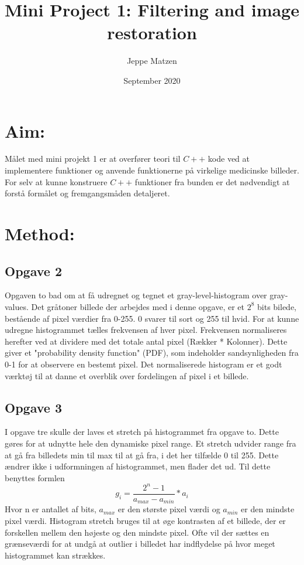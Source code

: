 \documentclass{article}
\title{Mini Project 1: Filtering and image restoration}
\author{Jeppe Matzen}
\date{September 2020}
\begin{document}
 
\lstset{style=mystyle} 
\maketitle 

\section{Aim:} 

Målet med mini projekt 1 er at overfører teori til $C++$ kode ved at implementere funktioner og anvende funktionerne på virkelige medicinske billeder. \newline 
For selv at kunne konstruere $C++$ funktioner fra bunden er det nødvendigt at forstå formålet og fremgangsmåden detaljeret.   

  

\section{Method:} 
\subsection{Opgave 2} 

Opgaven to bad om at få udregnet og tegnet et gray-level-histogram over gray-values. \newline 
Det gråtoner billede der arbejdes med i denne opgave, er et $2^8$ bits bilede, bestående af pixel værdier fra 0-255. 0 svarer til sort og 255 til hvid. \newline 
For at kunne udregne histogrammet tælles frekvensen af hver pixel. Frekvensen normaliseres herefter ved at dividere med det totale antal pixel (Rækker * Kolonner). Dette giver et "probability density function" (PDF), som indeholder sandsynligheden fra 0-1 for at observere en bestemt pixel. Det normaliserede histogram er et godt værktøj til at danne et overblik over fordelingen af pixel i et billede. \newline 

\subsection{Opgave 3} 

I opgave tre skulle der laves et stretch på histogrammet fra opgave to. Dette gøres for at udnytte hele den dynamiske pixel range. Et stretch udvider range fra at gå fra billedets min til max til at gå fra, i det her tilfælde 0 til 255. Dette ændrer ikke i udformningen af histogrammet, men flader det ud. Til dette benyttes formlen $$g_i = \frac{2^n - 1}{a_{max} - a_{min}} * a_i $$ \newline Hvor n er antallet af bits, $a_{max}$ er den største pixel værdi og $a_{min}$ er den mindste pixel værdi. 
Histogram stretch bruges til at øge kontrasten af et billede, der er forskellen mellem den højeste og den mindste pixel. Ofte vil der sættes en grænseværdi for at undgå at outlier i billedet har indflydelse på hvor meget histogrammet kan strækkes. 
\end{document}
